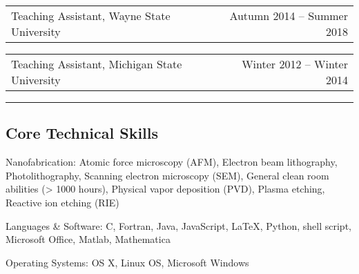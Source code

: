 \documentclass[10pt,letterpaper]{article}
\makeatletter
\newenvironment{indentsection}[1]%
{\begin{list}{}%
	{\setlength{\leftmargin}{#1}}%
	\item[]%
}
{\end{list}}
\newcommand{\headerrow}[2]
{\begin{tabular*}{\linewidth}{l@{\extracolsep{\fill}}r}
	#1 &
	#2 \\
\end{tabular*}}
\newcommand{\CPP}
{C\nolinebreak[4]\hspace{-.05em}\raisebox{.22ex}{\footnotesize\bf ++}}
\makeatother
\begin{document}
\begin{itemize*}
\begin{comment}
	\item[]
	\headerrow
		{Teaching Assistant, Introductory Physics II, Michigan State University}
		{Winter 2012}
	\end{comment}

	\item[]
	\headerrow
		{Teaching Assistant, Wayne State University}
		{Autumn 2014 -- Summer 2018}
	\item[]
	\headerrow
		{Teaching Assistant, Michigan State University}
		{Winter 2012 -- Winter 2014}

\end{itemize*}

\hrule
\vspace{-0.4em}
\subsection*{Core Technical Skills}

\begin{indentsection}{\parindent}
\begin{description*}
	\item[Nanofabrication:]
	Atomic force microscopy (AFM), Electron beam lithography, Photolithography, Scanning electron microscopy (SEM), General clean room abilities (> 1000 hours), Physical vapor deposition (PVD), Plasma etching, Reactive ion etching (RIE)
	\item[Languages \& Software:]
	\CPP, Fortran, Java, JavaScript, \LaTeX, Python, shell script, Microsoft Office, Matlab, Mathematica
	\item[Operating Systems:]
	OS X, Linux OS, Microsoft Windows
\end{description*}
\end{indentsection}
\end{document}
